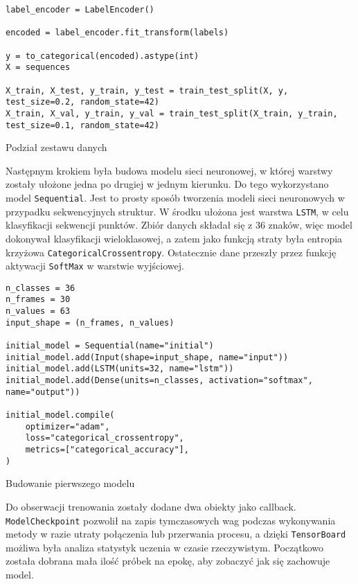 \begin{listing}[H]
    \color{white}
    \begin{verbatim}
label_encoder = LabelEncoder()

encoded = label_encoder.fit_transform(labels)

y = to_categorical(encoded).astype(int)
X = sequences

X_train, X_test, y_train, y_test = train_test_split(X, y, test_size=0.2, random_state=42)
X_train, X_val, y_train, y_val = train_test_split(X_train, y_train, test_size=0.1, random_state=42)
    \end{verbatim}
    \caption{Podział zestawu danych}
    \label{lst:dataset-splitting}
\end{listing}

Następnym krokiem była budowa modelu sieci neuronowej, w której warstwy zostały ułożone jedna po drugiej w jednym kierunku. Do tego wykorzystano model \texttt{Sequential}. Jest to prosty sposób tworzenia modeli sieci neuronowych w przypadku sekwencyjnych struktur. W środku ułożona jest warstwa \texttt{LSTM}, w celu klasyfikacji sekwencji punktów. Zbiór danych składał się z 36 znaków, więc model dokonywał klasyfikacji wieloklasowej, a zatem jako funkcją straty była entropia krzyżowa \texttt{CategoricalCrossentropy}. Ostatecznie dane przeszły przez funkcję aktywacji \texttt{SoftMax} w warstwie wyjściowej.

\begin{listing}[H]
    \color{white}
    \begin{verbatim}
n_classes = 36
n_frames = 30
n_values = 63
input_shape = (n_frames, n_values)

initial_model = Sequential(name="initial")
initial_model.add(Input(shape=input_shape, name="input"))
initial_model.add(LSTM(units=32, name="lstm"))
initial_model.add(Dense(units=n_classes, activation="softmax", name="output"))

initial_model.compile(
    optimizer="adam",
    loss="categorical_crossentropy",
    metrics=["categorical_accuracy"],
)
    \end{verbatim}
    \caption{Budowanie pierwszego modelu}
    \label{lst:initial-model-building}
\end{listing}

Do obserwacji trenowania zostały dodane dwa obiekty jako callback. \texttt{ModelCheckpoint} pozwolił na zapis tymczasowych wag podczas wykonywania metody w razie utraty połączenia lub przerwania procesu, a dzięki \texttt{TensorBoard} możliwa była analiza statystyk uczenia w czasie rzeczywistym. Początkowo została dobrana mała ilość próbek na epokę, aby zobaczyć jak się zachowuje model.

